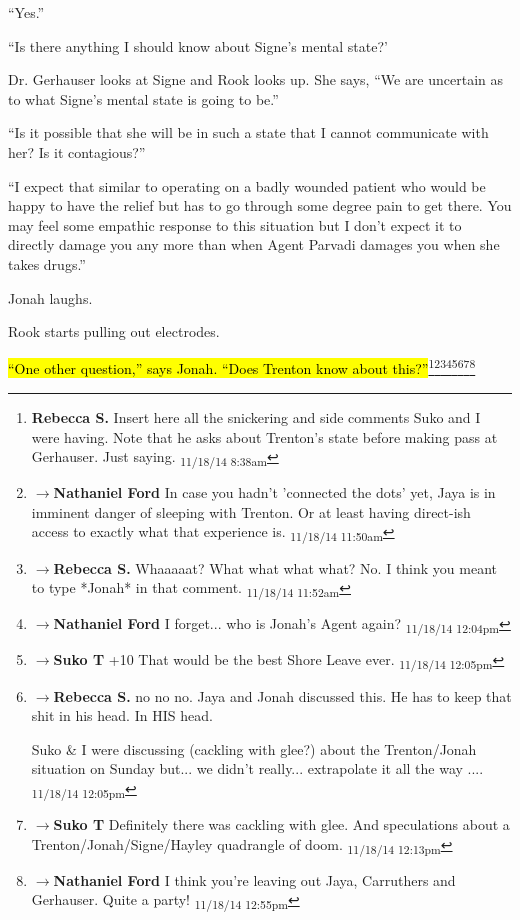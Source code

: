 ``Yes.''

``Is there anything I should know about Signe's mental state?'

Dr. Gerhauser looks at Signe and Rook looks up.  She says, ``We are uncertain as to what Signe's mental state is going to be.''

``Is it possible that she will be in such a state that I cannot communicate with her?  Is it contagious?''

``I expect that similar to operating on a badly wounded patient who would be happy to have the relief but has to go through some degree pain to get there.  You may feel some empathic response to this situation but I don't expect it to directly damage you any more than when Agent Parvadi damages you when she takes drugs.''

Jonah laughs.  

Rook starts pulling out electrodes.

\hl{``One other question,'' says Jonah.  ``Does Trenton know about this?''}\footnote{\textbf{Rebecca S. }Insert here all the snickering and side comments Suko and I were having.  Note that he asks about Trenton's state before making pass at Gerhauser.  Just saying. \textsubscript{11/18/14 8:38am}}\footnote{$\rightarrow$\textbf{Nathaniel Ford }In case you hadn't 'connected the dots' yet, Jaya is in imminent danger of sleeping with Trenton. Or at least having direct-ish access to exactly what that experience is. \textsubscript{11/18/14 11:50am}}\footnote{$\rightarrow$\textbf{Rebecca S. }Whaaaaat?  What what what what?  No.  I think you meant to type *Jonah* in that comment. \textsubscript{11/18/14 11:52am}}\footnote{$\rightarrow$\textbf{Nathaniel Ford }I forget... who is Jonah's Agent again? \textsubscript{11/18/14 12:04pm}}\footnote{$\rightarrow$\textbf{Suko T }+10  That would be the best Shore Leave ever. \textsubscript{11/18/14 12:05pm}}\footnote{$\rightarrow$\textbf{Rebecca S. }no no no. Jaya and Jonah discussed this. He has to keep that shit in his head.  In HIS head. 

Suko \& I were discussing (cackling with glee?) about the Trenton/Jonah situation on Sunday but... we didn't really... extrapolate it all the way .... \textsubscript{11/18/14 12:05pm}}\footnote{$\rightarrow$\textbf{Suko T }Definitely there was cackling with glee.  And speculations about a Trenton/Jonah/Signe/Hayley quadrangle of doom. \textsubscript{11/18/14 12:13pm}}\footnote{$\rightarrow$\textbf{Nathaniel Ford }I think you're leaving out Jaya, Carruthers and Gerhauser. Quite a party! \textsubscript{11/18/14 12:55pm}}


